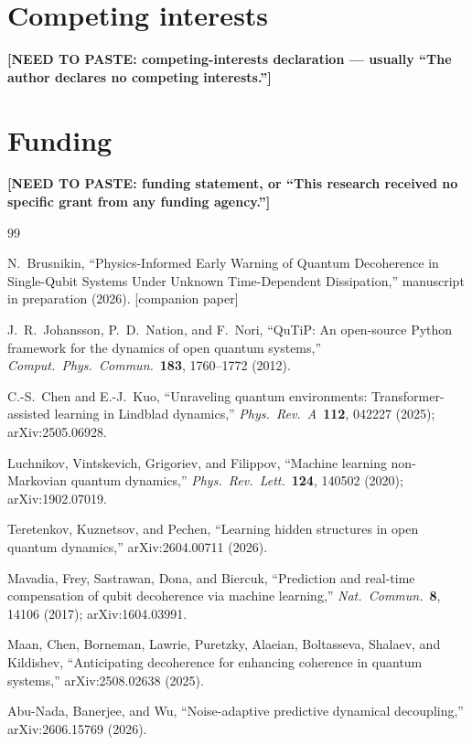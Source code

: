 \documentclass[twocolumn,10pt]{article}
\newcommand{\needspaste}[1]{{\color{red}\textbf{[NEED TO PASTE: #1]}}}
\begin{document}
\section*{Competing interests}
\needspaste{competing-interests declaration --- usually ``The author
declares no competing interests.''}

\section*{Funding}
\needspaste{funding statement, or ``This research received no specific
grant from any funding agency.''}


\begin{thebibliography}{99}

N.~Brusnikin,
``Physics-Informed Early Warning of Quantum Decoherence in Single-Qubit
  Systems Under Unknown Time-Dependent Dissipation,''
manuscript in preparation (2026). [companion paper]

J.~R.~Johansson, P.~D.~Nation, and F.~Nori,
``QuTiP: An open-source Python framework for the dynamics of open
  quantum systems,''
\textit{Comput.\ Phys.\ Commun.}\ \textbf{183}, 1760--1772 (2012).

C.-S.~Chen and E.-J.~Kuo,
``Unraveling quantum environments: Transformer-assisted learning in
  Lindblad dynamics,''
\textit{Phys.\ Rev.\ A}\ \textbf{112}, 042227 (2025); arXiv:2505.06928.

Luchnikov, Vintskevich, Grigoriev, and Filippov,
``Machine learning non-Markovian quantum dynamics,''
\textit{Phys.\ Rev.\ Lett.}\ \textbf{124}, 140502 (2020); arXiv:1902.07019.

Teretenkov, Kuznetsov, and Pechen,
``Learning hidden structures in open quantum dynamics,''
arXiv:2604.00711 (2026).

Mavadia, Frey, Sastrawan, Dona, and Biercuk,
``Prediction and real-time compensation of qubit decoherence via machine
  learning,''
\textit{Nat.\ Commun.}\ \textbf{8}, 14106 (2017); arXiv:1604.03991.

Maan, Chen, Borneman, Lawrie, Puretzky, Alaeian, Boltasseva, Shalaev, and
Kildishev,
``Anticipating decoherence for enhancing coherence in quantum systems,''
arXiv:2508.02638 (2025).

Abu-Nada, Banerjee, and Wu,
``Noise-adaptive predictive dynamical decoupling,''
arXiv:2606.15769 (2026).


\end{thebibliography}
\end{document}
